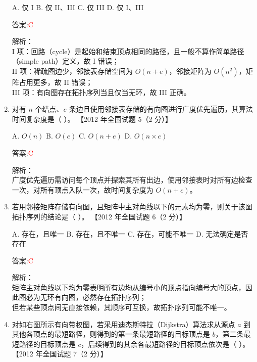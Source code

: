 \documentclass[lang=cn,newtx,10pt,scheme=chinese]{../../../elegantbook}
\begin{document}
\begin{enumerate}
        A. 仅 I  
        B. 仅 II、III  
        C. 仅 III  
        D. 仅 I、III
    
        答案:\textcolor{red}{C}
    
        解析：\\
        I 项：回路（cycle）是起始和结束顶点相同的路径，且一般不算作简单路径（simple path）定义，故 I 错误；\\
        II 项：稀疏图边少，邻接表存储空间为 $O(n+e)$，邻接矩阵为 $O(n^2)$，矩阵占用更多，故 II 错误；\\
        III 项：有向图存在拓扑序列当且仅当无环，故 III 正确。\\
    
    \item 对有 $n$ 个结点、$e$ 条边且使用邻接表存储的有向图进行广度优先遍历，其算法时间复杂度是（ ）。  
        【2012 年全国试题 5（2 分）】
    
        A. $O(n)$  
        B. $O(e)$  
        C. $O(n + e)$  
        D. $O(n \times e)$
    
        答案:\textcolor{red}{C}
    
        解析：\\
        广度优先遍历需访问每个顶点并探索其所有出边，使用邻接表时对所有边检查一次，对所有顶点入队一次，故时间复杂度为 $O(n + e)$。\\
    
    \item 若用邻接矩阵存储有向图，且矩阵中主对角线以下的元素均为零，则关于该图拓扑序列的结论是（ ）。  
        【2012 年全国试题 6（2 分）】
    
        A. 存在，且唯一  
        B. 存在，且不唯一  
        C. 存在，可能不唯一  
        D. 无法确定是否存在
    
        答案:\textcolor{red}{C}
    
        解析：\\
        矩阵主对角线以下均为零表明所有边均从编号小的顶点指向编号大的顶点，因此图必为无环有向图，必然存在拓扑序列；\\
        但若某些顶点间无直接依赖，其顺序可互换，故拓扑序列可能不唯一。\\
    
    
        \item 对如右图所示有向带权图，若采用迪杰斯特拉（Dijkstra）算法求从源点 $a$ 到其他各顶点的最短路径，则得到的第一条最短路径的目标顶点是 $b$，第二条最短路径的目标顶点是 $c$，后续得到的其余各最短路径的目标顶点依次是（ ）。  
        【2012 年全国试题 7（2 分）】  


\end{enumerate}
\end{document}
